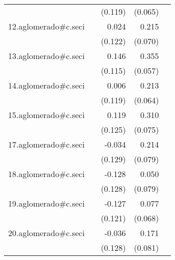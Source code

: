 {\begin{longtable}{l*{4}{D{.}{.}{-1}}}
            &                     &     (0.119)         &     (0.065)         &                     \\
\addlinespace
12.aglomerado#c.seci&                     &       0.024         &       0.215\sym{**} &                     \\
            &                     &     (0.122)         &     (0.070)         &                     \\
\addlinespace
13.aglomerado#c.seci&                     &       0.146         &       0.355\sym{***}&                     \\
            &                     &     (0.115)         &     (0.057)         &                     \\
\addlinespace
14.aglomerado#c.seci&                     &       0.006         &       0.213\sym{***}&                     \\
            &                     &     (0.119)         &     (0.064)         &                     \\
\addlinespace
15.aglomerado#c.seci&                     &       0.119         &       0.310\sym{***}&                     \\
            &                     &     (0.125)         &     (0.075)         &                     \\
\addlinespace
17.aglomerado#c.seci&                     &      -0.034         &       0.214\sym{**} &                     \\
            &                     &     (0.129)         &     (0.079)         &                     \\
\addlinespace
18.aglomerado#c.seci&                     &      -0.128         &       0.050         &                     \\
            &                     &     (0.128)         &     (0.079)         &                     \\
\addlinespace
19.aglomerado#c.seci&                     &      -0.127         &       0.077         &                     \\
            &                     &     (0.121)         &     (0.068)         &                     \\
\addlinespace
20.aglomerado#c.seci&                     &      -0.036         &       0.171\sym{*}  &                     \\
            &                     &     (0.128)         &     (0.081)         &                     \\

\end{longtable}}
